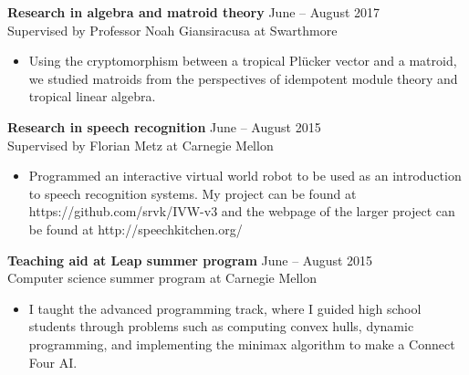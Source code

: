\documentclass[10pt]{res} %
\begin{document}
\begin{resume}
\vspace{8pt} %

{\bf Research in algebra and matroid theory} \hfill June -- August 2017 \\
Supervised by Professor Noah Giansiracusa at Swarthmore
\begin{itemize} \itemsep -2pt %
        \item Using the cryptomorphism between a tropical Pl\"{u}cker vector and a 
    matroid, we studied matroids from the perspectives of 
        idempotent module theory and tropical linear algebra.
\end{itemize}

{\bf Research in speech recognition} \hfill June -- August 2015 \\[2pt]
Supervised by Florian Metz at Carnegie Mellon
\begin{itemize} \itemsep -2pt %
    \item Programmed an interactive virtual world robot to be used as an 
        introduction to speech recognition systems. My project can be 
        found at https://github.com/srvk/IVW-v3 and the webpage of the 
        larger project can be found at http://speechkitchen.org/
\end{itemize}

{\bf Teaching aid at Leap summer program} \hfill June -- August 2015
    \\[2pt]
    Computer science summer program at Carnegie Mellon
\begin{itemize} \itemsep -2pt %
        \item I taught the advanced programming track, where I guided 
            high school students through problems such as computing convex 
            hulls, dynamic programming, and implementing the minimax 
            algorithm to make a Connect Four AI.
\end{itemize}

\vspace{0.2in} %



\end{resume}
\end{document}

